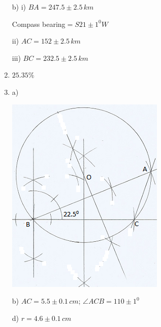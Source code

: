 \documentclass[
  a4paperpaper,
]{scrbook}
\begin{document}
\begin{tcolorbox}
\begin{enumerate}
  b) i) \(BA=247.5\pm 2.5\, km\)

  Compass bearing\(=S21\pm1^0W\)

  ii) \(AC=152\pm2.5\,km\)

  iii) \(BC=232.5\pm2.5\,km\)
\item
  \(25.35\%\)
\item
  a)

  \includegraphics{figures/M5N21.png}

  b) \(AC=5.5\pm0.1\,cm\); \(\angle ACB=110\pm1^0\)

  d) \(r=4.6\pm0.1\,cm\)
\end{enumerate}

\end{tcolorbox}
\end{document}
